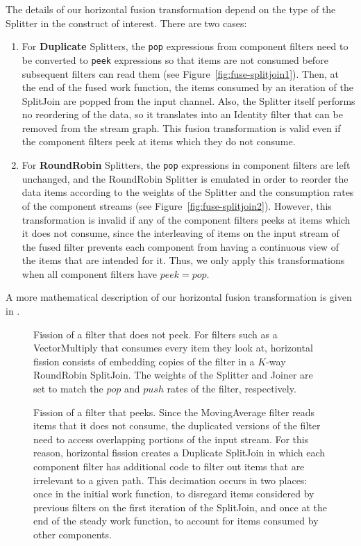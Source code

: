 The details of our horizontal fusion transformation depend on the type
of the Splitter in the construct of interest.  There are two cases:
\begin{enumerate}
\item For {\bf Duplicate} Splitters, the {\tt pop} expressions from
component filters need to be converted to {\tt peek} expressions so
that items are not consumed before subsequent filters can read them
(see Figure~\ref{fig:fuse-splitjoin1}).  Then, at the end of the fused
work function, the items consumed by an iteration of the SplitJoin are
popped from the input channel.  Also, the Splitter itself performs no
reordering of the data, so it translates into an Identity filter that
can be removed from the stream graph.  This fusion transformation is
valid even if the component filters peek at items which they do not
consume.

\item For {\bf RoundRobin} Splitters, the {\tt pop} expressions in
component filters are left unchanged, and the RoundRobin Splitter is
emulated in order to reorder the data items according to the weights
of the Splitter and the consumption rates of the component streams
(see Figure~\ref{fig:fuse-splitjoin2}).  However, this transformation
is invalid if any of the component filters peeks at items which it
does not consume, since the interleaving of items on the input stream
of the fused filter prevents each component from having a continuous
view of the items that are intended for it.  Thus, we only apply this
transformations when all component filters have $peek = pop$.
\end{enumerate}

A more mathematical description of our horizontal fusion
transformation is given in \cite{streamittech2}.

\begin{figure}
\centering
{}
\caption{\protect\small Fission of a filter that does not peek.  For
filters such as a VectorMultiply that consumes every item they look
at, horizontal fission consists of embedding copies of the filter in a
$K$-way RoundRobin SplitJoin.  The weights of the Splitter and Joiner
are set to match the $pop$ and $push$ rates of the filter,
respectively.  \protect\label{fig:fission-nopeek}}
\vspace{18pt}
\caption{\protect\small Fission of a filter that peeks.  Since the
MovingAverage filter reads items that it does not consume, the
duplicated versions of the filter need to access overlapping portions
of the input stream.  For this reason, horizontal fission creates a
Duplicate SplitJoin in which each component filter has additional code
to filter out items that are irrelevant to a given path.  This
decimation occurs in two places: once in the initial work function, to
disregard items considered by previous filters on the first iteration
of the SplitJoin, and once at the end of the steady work function, to
account for items consumed by other components.
\protect\label{fig:fission-peek}}
\end{figure}

